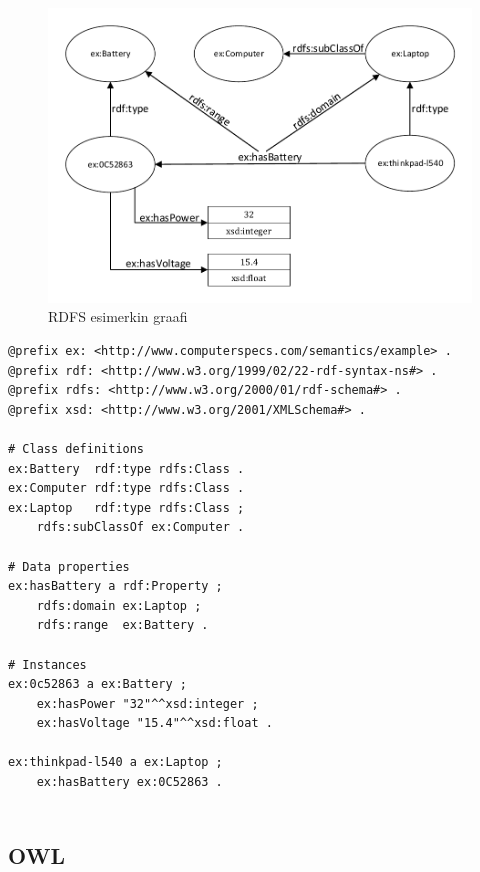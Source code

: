 \documentclass[finnish, 12pt, a4paper, elec, utf8, pdfa, online]{aaltothesis}
\begin{document}
{\begin{figure}[htb]
\centering
\includegraphics[width=15cm]{images/laptop.pdf}
\vspace{-3pc}
\caption{RDFS esimerkin graafi}
\label{images/laptop}
\end{figure}
\vskip 0.75cm
\begin{lstlisting}[style=codeblock,caption={RDFS esimerkki.},captionpos=b,label={rdfs_esim}]
@prefix ex: <http://www.computerspecs.com/semantics/example> .
@prefix rdf: <http://www.w3.org/1999/02/22-rdf-syntax-ns#> .
@prefix rdfs: <http://www.w3.org/2000/01/rdf-schema#> .
@prefix xsd: <http://www.w3.org/2001/XMLSchema#> .

# Class definitions
ex:Battery  rdf:type rdfs:Class .
ex:Computer rdf:type rdfs:Class .
ex:Laptop   rdf:type rdfs:Class ;
    rdfs:subClassOf ex:Computer .

# Data properties
ex:hasBattery a rdf:Property ;
    rdfs:domain ex:Laptop ;
    rdfs:range  ex:Battery .

# Instances
ex:0c52863 a ex:Battery ;
    ex:hasPower "32"^^xsd:integer ;
    ex:hasVoltage "15.4"^^xsd:float .

ex:thinkpad-l540 a ex:Laptop ;
    ex:hasBattery ex:0C52863 .


\end{lstlisting}

\subsection{OWL}

}
\end{document}
